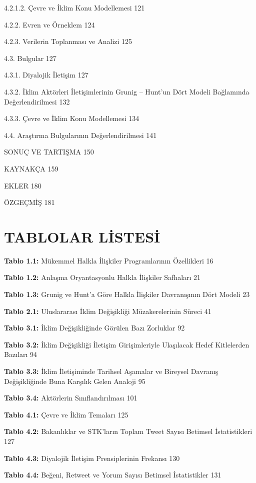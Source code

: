 \documentclass[
]{book}
\begin{document}
4.2.1.2. Çevre ve İklim Konu Modellemesi 121

4.2.2. Evren ve Örneklem 124

4.2.3. Verilerin Toplanması ve Analizi 125

4.3. Bulgular 127

4.3.1. Diyalojik İletişim 127

4.3.2. İklim Aktörleri İletişimlerinin Grunig -- Hunt'un Dört Modeli Bağlamında
Değerlendirilmesi 132

4.3.3. Çevre ve İklim Konu Modellemesi 134

4.4. Araştırma Bulgularının Değerlendirilmesi 141

SONUÇ VE TARTIŞMA 150

KAYNAKÇA 159

EKLER 180

ÖZGEÇMİŞ 181

\hypertarget{tablolar-listesi}{%
\chapter*{TABLOLAR LİSTESİ}\label{tablolar-listesi}}

\textbf{Tablo 1.1:} Mükemmel Halkla İlişkiler Programlarının Özellikleri 16

\textbf{Tablo 1.2:} Anlaşma Oryantasyonlu Halkla İlişkiler Safhaları 21

\textbf{Tablo 1.3:} Grunig ve Hunt'a Göre Halkla İlişkiler Davranışının Dört Modeli 23

\textbf{Tablo 2.1:} Uluslararası İklim Değişikliği Müzakerelerinin Süreci 41

\textbf{Tablo 3.1:} İklim Değişikliğinde Görülen Bazı Zorluklar 92

\textbf{Tablo 3.2:} İklim Değişikliği İletişim Girişimleriyle Ulaşılacak Hedef Kitlelerden Bazıları 94

\textbf{Tablo 3.3:} İklim İletişiminde Tarihsel Aşamalar ve Bireysel Davranış Değişikliğinde Buna Karşılık Gelen Analoji 95

\textbf{Tablo 3.4:} Aktörlerin Sınıflandırılması 101

\textbf{Tablo 4.1:} Çevre ve İklim Temaları 125

\textbf{Tablo 4.2:} Bakanlıklar ve STK'ların Toplam Tweet Sayısı Betimsel İstatistikleri 127

\textbf{Tablo 4.3:} Diyalojik İletişim Prensiplerinin Frekansı 130

\textbf{Tablo 4.4:} Beğeni, Retweet ve Yorum Sayısı Betimsel İstatistikler 131
\end{document}
